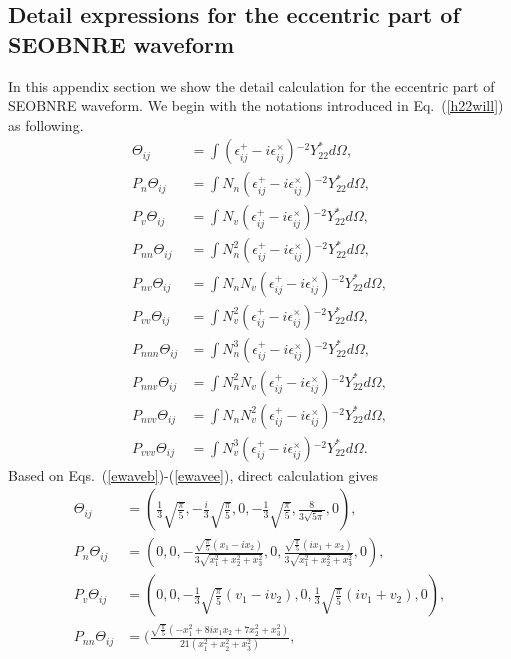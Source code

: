 \documentclass[prd,aps,a4paper,superscriptaddress,twocolumn,footinbib,showpacs]{revtex4}
\begin{document}
\begin{widetext}
\section{Detail expressions for the eccentric part of SEOBNRE waveform}
\label{App:waveform}
In this appendix section we show the detail calculation for the eccentric part of SEOBNRE waveform. We begin with the notations introduced in Eq.~(\ref{h22will}) as following.
\begin{align}
\Theta_{ij}&=\int(\epsilon_{ij}^{+}-i\epsilon_{ij}^{\times}){}^{-2}Y^*_{22}d\Omega,\\
P_n\Theta_{ij}&=\int N_n(\epsilon_{ij}^{+}-i\epsilon_{ij}^{\times}){}^{-2}Y^*_{22}d\Omega,\\
P_v\Theta_{ij}&=\int N_v(\epsilon_{ij}^{+}-i\epsilon_{ij}^{\times}){}^{-2}Y^*_{22}d\Omega,\\
P_{nn}\Theta_{ij}&=\int N_n^2(\epsilon_{ij}^{+}-i\epsilon_{ij}^{\times}){}^{-2}Y^*_{22}d\Omega,\\
P_{nv}\Theta_{ij}&=\int N_nN_v(\epsilon_{ij}^{+}-i\epsilon_{ij}^{\times}){}^{-2}Y^*_{22}d\Omega,\\
P_{vv}\Theta_{ij}&=\int N_v^2(\epsilon_{ij}^{+}-i\epsilon_{ij}^{\times}){}^{-2}Y^*_{22}d\Omega,\\
P_{nnn}\Theta_{ij}&=\int N_n^3(\epsilon_{ij}^{+}-i\epsilon_{ij}^{\times}){}^{-2}Y^*_{22}d\Omega,\\
P_{nnv}\Theta_{ij}&=\int N_n^2N_v(\epsilon_{ij}^{+}-i\epsilon_{ij}^{\times}){}^{-2}Y^*_{22}d\Omega,\\
P_{nvv}\Theta_{ij}&=\int N_nN_v^2(\epsilon_{ij}^{+}-i\epsilon_{ij}^{\times}){}^{-2}Y^*_{22}d\Omega,\\
P_{vvv}\Theta_{ij}&=\int N_v^3(\epsilon_{ij}^{+}-i\epsilon_{ij}^{\times}){}^{-2}Y^*_{22}d\Omega.
\end{align}
Based on Eqs.~(\ref{ewaveb})-(\ref{ewavee}), direct calculation gives
\begin{align}
\Theta_{ij}&=(\frac{1}{3}\sqrt{\frac{\pi }{5}},-\frac{i}{3}\sqrt{\frac{\pi }{5}},0,-\frac{1}{3}\sqrt{\frac{\pi }{5}},\frac{8}{3 \sqrt{5 \pi }},0),\\
P_n\Theta_{ij}&=(0,0,-\frac{\sqrt{\frac{\pi }{5}} (x_1-i x_2)}{3 \sqrt{x_1^2+x_2^2+x_3^2}},0,\frac{\sqrt{\frac{\pi }{5}} (i x_1+x_2)}{3 \sqrt{x_1^2+x_2^2+x_3^2}},0),\\
P_v\Theta_{ij}&=(0,0,-\frac{1}{3} \sqrt{\frac{\pi }{5}} (v_1-i v_2),
0,\frac{1}{3} \sqrt{\frac{\pi }{5}} (i v_1+v_2),0),\\
P_{nn}\Theta_{ij}&=(\frac{\sqrt{\frac{\pi }{5}} \left(-x_1^2+8 i x_1 x_2+7 x_2^2+x_3^2\right)}{21 \left(x_1^2+x_2^2+x_3^2\right)},

\end{align}
\end{widetext}
\end{document}
